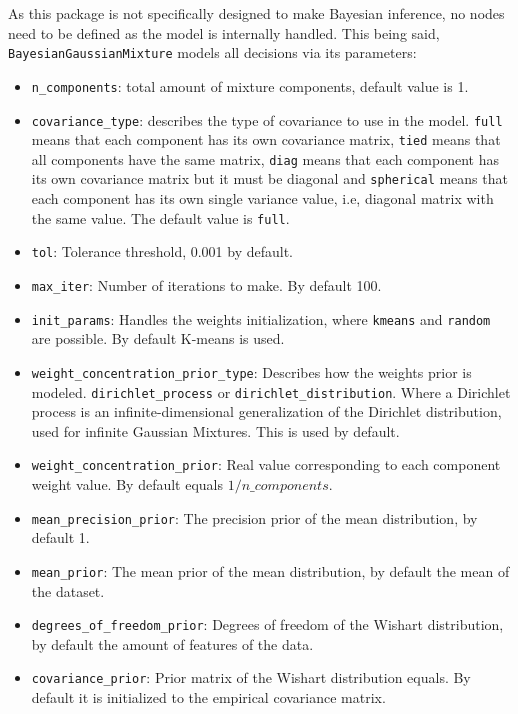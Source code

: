 As this package is not specifically designed to make Bayesian inference, no nodes need to be defined as the model is internally handled. This being said, \texttt{BayesianGaussianMixture} models all decisions via its parameters:
\begin{itemize}
  \item \texttt{n\_components}: total amount of mixture components, default value is 1.
  \item \texttt{covariance\_type}: describes the type of covariance to use in the model. \texttt{full} means that each component has its own covariance matrix, \texttt{tied} means that all components have the same matrix, \texttt{diag} means that each component has its own covariance matrix but it must be diagonal and \texttt{spherical} means that each component has its own single variance value, i.e, diagonal matrix with the same value. The default value is \texttt{full}.
  \item \texttt{tol}: Tolerance threshold, 0.001 by default.
  \item \texttt{max\_iter}: Number of iterations to make. By default 100.
  \item \texttt{init\_params}: Handles the weights initialization, where \texttt{kmeans} and \texttt{random} are possible. By default K-means is used.
  \item \texttt{weight\_concentration\_prior\_type}: Describes how the weights prior is modeled. \texttt{dirichlet\_process} or \texttt{dirichlet\_distribution}. Where a Dirichlet process is an infinite-dimensional generalization of the Dirichlet distribution, used for infinite Gaussian Mixtures. This is used by default.
  \item \texttt{weight\_concentration\_prior}: Real value corresponding to each component weight value. By default equals \(1/n\_components\).
  \item \texttt{mean\_precision\_prior}: The precision prior of the mean distribution, by default 1.
  \item \texttt{mean\_prior}: The mean prior of the mean distribution, by default the mean of the dataset.
  \item \texttt{degrees\_of\_freedom\_prior}: Degrees of freedom of the Wishart distribution, by default the amount of features of the data.
  \item \texttt{covariance\_prior}: Prior matrix of the Wishart distribution equals. By default it is initialized to the empirical covariance matrix.
\end{itemize}

